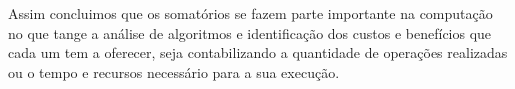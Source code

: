 \documentclass[12pt]{article}
\begin{document}
Assim concluimos que os somatórios se fazem parte importante na computação no que tange a análise de algoritmos e identificação dos custos e benefícios que cada um tem a oferecer, seja contabilizando a quantidade de operações realizadas ou o tempo e recursos necessário para a sua execução.

\nocite{s1}
\nocite{s2}
\nocite{s3}
\nocite{s4}



\end{document}
